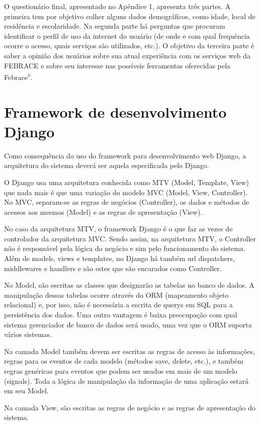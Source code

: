     O questionário final, apresentado no Apêndice 1, apresenta três partes. A primeira tem por objetivo colher alguns dados demográficos, como idade, local de residência e escolaridade. Na segunda parte há perguntas que procuram identificar o perfil de uso da internet do usuário (de onde e com qual frequência ocorre o acesso, quais serviços são utilizados, etc.). O objetivo da terceira parte é saber a opinião dos usuários sobre sua atual experiência com os serviços web da FEBRACE e sobre seu interesse nas possíveis ferramentas oferecidas pela Febrace\textsuperscript{v}.


\section{Framework de desenvolvimento Django}

    Como consequência do uso do framework para desenvolvimento web Django, a arquitetura do sistema deverá ser aquela especificada pelo Django.

    O Django usa uma arquitetura conhecida como MTV (Model, Template, View) que nada mais é que uma variação do modelo MVC (Model, View, Controller). No MVC, separam-se as regras de negócios (Controller), os dados e métodos de acessos aos mesmos (Model) e as regras de apresentação (View).

    No caso da arquitetura MTV, o framework Django é o que faz as vezes de controlador da arquitetura MVC. Sendo assim, na arquitetura MTV, o Controller não é responsável pela lógica do negócio e sim pelo funcionamento do sistema. Além de models, views e templates, no Django há também url dispatchers, middlewares e handlers e são estes que são encarados como Controller.

    No Model, são escritas as classes que designarão as tabelas no banco de dados. A manipulação dessas tabelas ocorre através do ORM (mapeamento objeto relacional) e, por isso, não é necessária a escrita de querys em SQL para a persistência dos dados. Uma outra vantagem é baixa preocupação com qual sistema gerenciador de banco de dados será usado, uma vez que o ORM suporta vários sistemas.

    Na camada Model também devem ser escritas as regras de acesso às informações, regras para os eventos de cada modelo (métodos save, delete, etc.), e também regras genéricas para eventos que podem ser usados em mais de um modelo (signals). Toda a lógica de manipulação da informação de uma aplicação estará em seu Model.

    Na camada View, são escritas as regras de negócio e as regras de apresentação do sistema.

